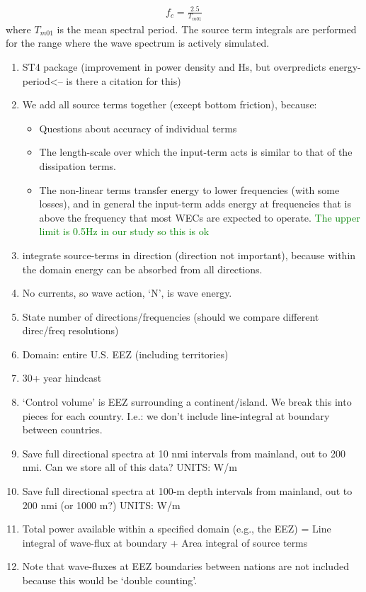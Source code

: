 \begin{align}
  f_{c} = \frac{2.5}{T_{m01}}
\end{align}
where $T_{m01}$ is the mean spectral period. The source term integrals are performed for the range where the wave spectrum is actively simulated.

\begin{enumerate}
\item ST4 package (improvement in power density and Hs, but overpredicts energy-period<-- is there a citation for this)
\item We add all source terms together (except bottom friction), because:
  \begin{itemize}
  \item Questions about accuracy of individual terms \citep{garcia-medinaWaveResourceAssessment2014}
  \item The length-scale over which the input-term acts is similar to that of the dissipation terms.
  \item The non-linear terms transfer energy to lower frequencies (with some losses), and in general the input-term adds energy at frequencies that is above the frequency that most WECs are expected to operate.  \textcolor{green}{The upper limit is 0.5Hz in our study so this is ok}
  \end{itemize}
\item integrate source-terms in direction (direction not important), because within the domain energy can be absorbed from all directions.
\item No currents, so wave action, ‘N’, is wave energy.
\item State number of directions/frequencies (should we compare different direc/freq resolutions)
\item Domain: entire U.S. EEZ (including territories)
\item 30+ year hindcast
\item ‘Control volume’ is EEZ surrounding a continent/island. We break this into pieces for each country. I.e.: we don’t include line-integral at boundary between countries.
\item Save full directional spectra at 10 nmi intervals from mainland, out to 200 nmi. Can we store all of this data? UNITS: W/m
\item Save full directional spectra at 100-m depth intervals from mainland, out to 200 nmi (or 1000 m?) UNITS: W/m
\item Total power available within a specified domain (e.g., the EEZ) = Line integral of wave-flux at boundary + Area integral of source terms
\item Note that wave-fluxes at EEZ boundaries between nations are not included because this would be ‘double counting’.
\end{enumerate}

